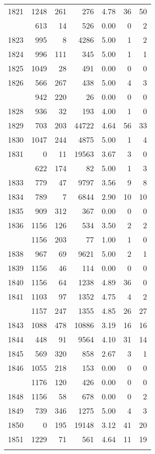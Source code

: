 \documentclass[
]{article}
\begin{document}
\begin{table}
\begin{tabular}[t]{lrrrrrr}
1821 & 1248 & 261 & 276 & 4.78 & 36 & 50\\
\addlinespace
1822 & 613 & 14 & 526 & 0.00 & 0 & 2\\
1823 & 995 & 8 & 4286 & 5.00 & 1 & 2\\
1824 & 996 & 111 & 345 & 5.00 & 1 & 1\\
1825 & 1049 & 28 & 491 & 0.00 & 0 & 0\\
1826 & 566 & 267 & 438 & 5.00 & 4 & 3\\
\addlinespace
1827 & 942 & 220 & 26 & 0.00 & 0 & 0\\
1828 & 936 & 32 & 193 & 4.00 & 1 & 0\\
1829 & 703 & 203 & 44722 & 4.64 & 56 & 33\\
1830 & 1047 & 244 & 4875 & 5.00 & 1 & 4\\
1831 & 0 & 11 & 19563 & 3.67 & 3 & 0\\
\addlinespace
1832 & 622 & 174 & 82 & 5.00 & 1 & 3\\
1833 & 779 & 47 & 9797 & 3.56 & 9 & 8\\
1834 & 789 & 7 & 6844 & 2.90 & 10 & 10\\
1835 & 909 & 312 & 367 & 0.00 & 0 & 0\\
1836 & 1156 & 126 & 534 & 3.50 & 2 & 2\\
\addlinespace
1837 & 1156 & 203 & 77 & 1.00 & 1 & 0\\
1838 & 967 & 69 & 9621 & 5.00 & 2 & 1\\
1839 & 1156 & 46 & 114 & 0.00 & 0 & 0\\
1840 & 1156 & 64 & 1238 & 4.89 & 36 & 0\\
1841 & 1103 & 97 & 1352 & 4.75 & 4 & 2\\
\addlinespace
1842 & 1157 & 247 & 1355 & 4.85 & 26 & 27\\
1843 & 1088 & 478 & 10886 & 3.19 & 16 & 16\\
1844 & 448 & 91 & 9564 & 4.10 & 31 & 14\\
1845 & 569 & 320 & 858 & 2.67 & 3 & 1\\
1846 & 1055 & 218 & 153 & 0.00 & 0 & 0\\
\addlinespace
1847 & 1176 & 120 & 426 & 0.00 & 0 & 0\\
1848 & 1156 & 58 & 678 & 0.00 & 0 & 2\\
1849 & 739 & 346 & 1275 & 5.00 & 4 & 3\\
1850 & 0 & 195 & 19148 & 3.12 & 41 & 20\\
1851 & 1229 & 71 & 561 & 4.64 & 11 & 19\\
\addlinespace

\end{tabular}
\end{table}
\end{document}
